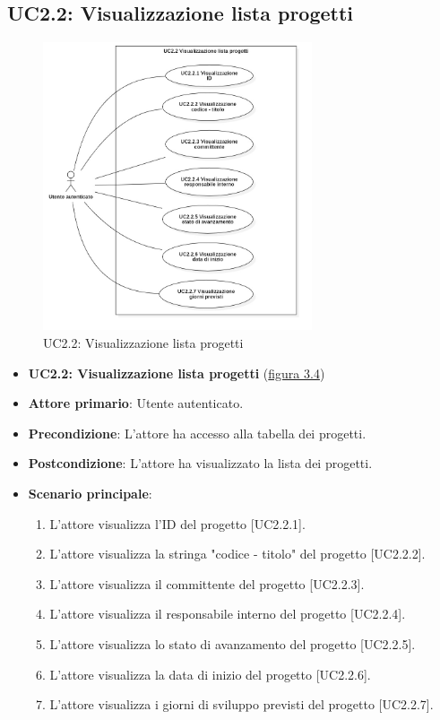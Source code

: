 \pagebreak

\subsection{UC2.2: Visualizzazione lista progetti}
\begin{figure}[!h]
\centering
\includegraphics[width=300px]{../images/UC/.jpeg/UC2.2-visualizzazioneListaProgetti.jpg}
\caption{UC2.2: Visualizzazione lista progetti}
\label{fig:UC2.2}
\end{figure}

\begin{itemize}
\item \textbf{UC2.2: Visualizzazione lista progetti} ({\hyperref[fig:UC2.2]{figura 3.4}})
\item \textbf{Attore primario}: Utente autenticato.
\item \textbf{Precondizione}: L'attore ha accesso alla tabella dei progetti.
\item \textbf{Postcondizione}: L'attore ha visualizzato la lista dei progetti.
\item \textbf{Scenario principale}: 
\begin{enumerate}
\item L'attore visualizza l'ID del progetto [UC2.2.1].
\item L'attore visualizza la stringa "codice - titolo" del progetto [UC2.2.2].
\item L'attore visualizza il committente del progetto [UC2.2.3].
\item L'attore visualizza il responsabile interno del progetto [UC2.2.4].
\item L'attore visualizza lo stato di avanzamento del progetto [UC2.2.5].
\item L'attore visualizza la data di inizio del progetto [UC2.2.6].
\item L'attore visualizza i giorni di sviluppo previsti del progetto [UC2.2.7].
\end{enumerate}
\end{itemize}

